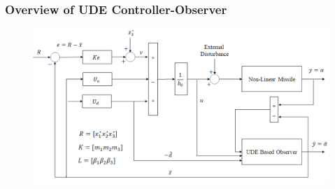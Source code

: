 \documentclass[table,10pt,red]{beamer}	%
\begin{document}
\begin{frame}
\frametitle{Overview of UDE Controller-Observer}
\begin{figure}
	\includegraphics[width=0.8\linewidth]{block_diag}
\end{figure}

\end{frame}
\end{document}
